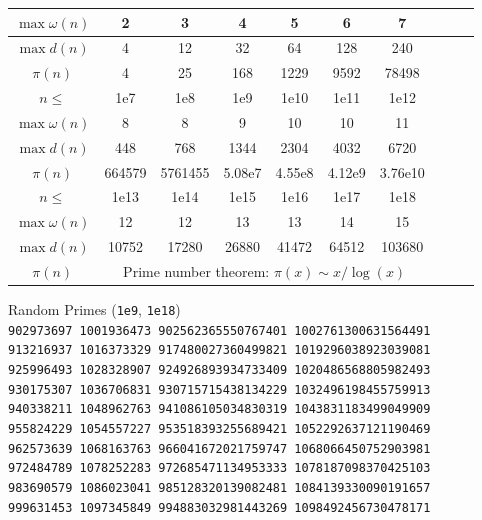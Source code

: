 \begin{table}[H]
\begin{tabular}{|c|c|c|c|c|c|c|c|c|c|}
		\hline
		$\max\omega(n)$ & 2 & 3 & 4 & 5 & 6 & 7  \\
		\hline
		$\max{d(n)}$ & 4 & 12 & 32 & 64 & 128 & 240 \\
		\hline
		$\pi(n)$ & 4 & 25 & 168 & 1229 & 9592 & 78498 \\
		\hline
		\rowcolor{black!10} $n \leq$ & 1e7 & 1e8 & 1e9 & 1e10 & 1e11& 1e12\\
		\hline
		$\max\omega(n)$ & 8 & 8 & 9 & 10& 10 & 11 \\
		\hline
		$\max{d(n)}$ & 448 & 768 & 1344 & 2304 & 4032 & 6720 \\
		\hline
		$\pi(n)$ & 664579 & 5761455 & 5.08e7 & 4.55e8 & 4.12e9 & 3.76e10 \\
		\hline
		\rowcolor{black!10} $n \leq$ & 1e13& 1e14& 1e15& 1e16& 1e17& 1e18 \\
		\hline
		$\max\omega(n)$ & 12 & 12 & 13 & 13 & 14 & 15 \\
		\hline
		$\max{d(n)}$ & 10752 & 17280 & 26880 & 41472 & 64512 & 103680\\
		\hline
		$\pi(n)$ & \multicolumn{6}{c|}{Prime number theorem: $\pi(x) \sim x / \log (x)$} \\
		\hline
	\end{tabular}
\end{table}

\begin{center}
\footnotesize
Random Primes (\texttt{1e9}, \texttt{1e18})\\
\texttt{902973697 1001936473 902562365550767401 1002761300631564491}\\
\texttt{913216937 1016373329 917480027360499821 1019296038923039081}\\
\texttt{925996493 1028328907 924926893934733409 1020486568805982493}\\
\texttt{930175307 1036706831 930715715438134229 1032496198455759913}\\
\texttt{940338211 1048962763 941086105034830319 1043831183499049909}\\
\texttt{955824229 1054557227 953518393255689421 1052292637121190469}\\
\texttt{962573639 1068163763 966041672021759747 1068066450752903981}\\
\texttt{972484789 1078252283 972685471134953333 1078187098370425103}\\
\texttt{983690579 1086023041 985128320139082481 1084139330090191657}\\
\texttt{999631453 1097345849 994883032981443269 1098492456730478171}\\
\end{center}

